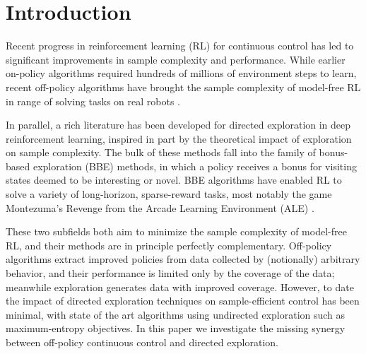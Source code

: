 \newcommand{\norm}[1]{\left\lVert#1\right\rVert}
\newcommand{\KL}[2]{D_{\mathrm{KL}} \bigl( #1 ~||~ #2 \bigr)}
\newcommand{\trans}{\mathbf{T}}
\newcommand{\qex}{Q_{\text{explore}}}
\newcommand{\qtask}{Q_{\text{task}}}
\newcommand{\tex}{\tau_{\text{explore}}}
\newcommand{\ttask}{\tau_{\text{task}}}
\newcommand{\pitask}{\pi_{\text{task}}}
\newcommand{\piexplore}{\pi_{\text{explore}}}
\newcommand{\algname}{Decoupled Exploration and Exploitation Policies} %
\newcommand{\algshort}{DEEP} %

\section{Introduction}
Recent progress in reinforcement learning (RL) for continuous control has led to significant improvements in sample complexity and performance.
While earlier on-policy algorithms required hundreds of millions of environment steps to learn, recent off-policy algorithms have brought the sample complexity of model-free RL in range of solving tasks on real robots \citep{haarnoja2018softapp}.

In parallel, a rich literature has been developed for directed exploration in deep reinforcement learning, inspired in part by the theoretical impact of exploration on sample complexity.
The bulk of these methods fall into the family of bonus-based exploration (BBE) methods, in which a policy receives a bonus for visiting states deemed to be interesting or novel.
BBE algorithms have enabled RL to solve a variety of long-horizon, sparse-reward tasks, most notably the game Montezuma's Revenge from the Arcade Learning Environment (ALE) \citep{Bellemare2015TheAL}.

These two subfields both aim to minimize the sample complexity of model-free RL, and their methods are in principle perfectly complementary.
Off-policy algorithms extract improved policies from data collected by (notionally) arbitrary behavior, and their performance is limited only by the coverage of the data;
meanwhile exploration generates data with improved coverage.
However, to date the impact of directed exploration techniques on sample-efficient control has been minimal, with state of the art algorithms using undirected exploration such as maximum-entropy objectives.
In this paper we investigate the missing synergy between off-policy continuous control and directed exploration.


